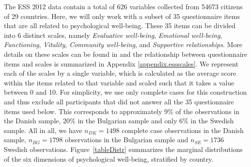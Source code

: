\documentclass[]{interact}
\theoremstyle{plain}%
\theoremstyle{definition}
\theoremstyle{remark}
\begin{document}
The ESS 2012 data contain a total of 626 variables collected from 54673 citizens of 29 countries. Here, we will only work with a subset of 35 questionnaire items that are all related to psychological well-being. These 35 items can be divided into 6 distinct scales, namely \textit{Evaluative well-being}, \textit{Emotional well-being}, \textit{Functioning}, \textit{Vitality}, \textit{Community well-being}, and \textit{Supportive relationships}. More details on these scales can be found in \cite{ESStopline5} and the relationship between questionnaire items and scales is summarized in Appendix \ref{appendix.essscales}. We represent each of the scales by a single variable, which is calculated as the average score within the items related to that variable and scaled such that it takes a value between 0 and 10. For simplicity, we use only complete cases for this construction and thus exclude all participants that did not answer all the 35 questionnaire items used below. This corresponds to approximately 9\% of the observations in the Danish sample, 20\% in the Bulgarian sample and only 6\% in the Swedish sample. All in all, we have $n_{DK} = 1498$ complete case observations in the Danish sample, $n_{BG} = 1798$ observations in the Bulgarian sample and $n_{SE} = 1736$ Swedish observations. Figure~\ref{tableDistr} summarizes the marginal distributions of the six dimensions of psychological well-being, stratified by country.

%
\end{document}
